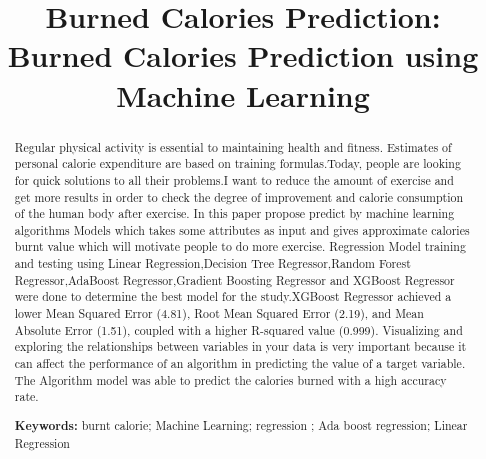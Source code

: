 \documentclass[conference]{IEEEtran}
\begin{document}
 \setlength {\marginparwidth }{2cm} 
\title{Burned Calories Prediction: Burned Calories Prediction using Machine Learning}


\author{

}


\maketitle
\begin{abstract}
Regular physical activity is essential to maintaining health and fitness. Estimates of personal calorie expenditure are based on training formulas.Today, people are looking for quick solutions to all their problems.I want to reduce the amount of exercise  and get more results in order to check the degree of improvement and calorie consumption of the human body after exercise. In this paper propose predict by machine learning algorithms Models which takes some attributes as input and gives approximate calories burnt value which will motivate people to do more exercise. Regression Model training and testing using Linear Regression,Decision Tree Regressor,Random Forest Regressor,AdaBoost Regressor,Gradient Boosting Regressor and XGBoost Regressor  were done to determine the best model for the study.XGBoost Regressor achieved a lower Mean Squared Error (4.81), Root Mean Squared Error (2.19), and Mean Absolute Error (1.51), coupled with a higher R-squared value (0.999). Visualizing and exploring the relationships between variables in your data is very important  because it can affect the performance of an algorithm in predicting the value of a target variable. The Algorithm model was able to predict the calories burned with a high accuracy rate.

\textbf{Keywords: }  burnt calorie; Machine Learning; regression ; Ada boost regression; Linear Regression
\end{abstract}
\end{document}
